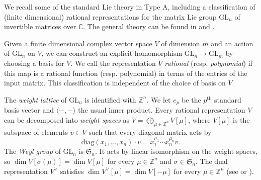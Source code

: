 \documentclass{amsart}
\newcommand\GL{\mathrm{GL}}
\newcommand\Z{\mathbb{Z}}
\theoremstyle{plain}
\theoremstyle{definition}
\numberwithin{equation}{section}
\begin{document}
We recall some of the standard Lie theory in Type A, including a classification of (finite dimensional) rational representations for the matrix Lie group $\mathrm{GL}_n$ of invertible matrices over $\mathbb{C}$. The general theory can be found in \cite{Hum72} and \cite{Ful91}.

Given a finite dimensional complex vector space $V$ of dimension $m$ and an action of $\GL_n$ on $V$, we can construct an explicit homomorphism $\GL_n\to\GL_m$ by choosing a basis for $V$. We call the representation $V$ \emph{rational} (resp. \emph{polynomial}) if this map is a rational function (resp. polynomial) in terms of the entries of the input matrix. This classification is independent of the choice of basis on $V$.

The \emph{weight lattice} of $\GL_n$ is identified with $\Z^n$. We let $e_p$ be the $p^\text{th}$ standard basis vector and $\langle-,-\rangle$ the usual inner product. Every rational representation $V$ can be decomposed into \emph{weight spaces} as $V=\bigoplus_{\mu\in\Z^n}V[\mu]$, where $V[\mu]$ is the subspace of elements $v\in V$ such that every diagonal matrix acts by
\[\mathrm{diag}(x_1,\dots,x_n)\cdot v=x_1^{\mu_1}\cdots x_n^{\mu_n}v.\]
The \emph{Weyl group} of $\GL_n$ is $\mathfrak{S}_n$. It acts by linear isomorphism on the weight spaces, so $\dim V[\sigma(\mu)]=\dim V[\mu]$ for every $\mu\in\Z^n$ and $\sigma\in\mathfrak{S}_n$. The dual representation $V^\vee$ satisfies $\dim V^\vee[\mu]=\dim V[-\mu]$ for every $\mu\in\mathbb{Z}^n$ (see \cite[\S0.2]{Kop84} or \cite[Theorem IV.5.A]{Weyl39}). 
\end{document}

